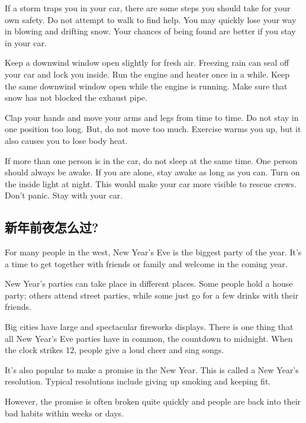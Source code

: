 If a storm traps you in your car, there are some steps
you should take for your own safety. Do not attempt to
walk to find help. You may quickly lose your way in blowing
and drifting snow. Your chances of being found are
better if you stay in your car.

Keep a downwind window open slightly for fresh air. Freezing
rain can seal off your car and lock you inside. Run the
engine and heater once in a while. Keep the same downwind
window open while the engine is running. Make sure
that snow has not blocked the exhaust pipe.

Clap your hands and move your arms and legs from time
to time. Do not stay in one position too long. But, do not
move too much. Exercise warms you up, but it also
causes you to lose body heat.

If more than one person is in the car, do not sleep at the
same time. One person should always be awake. If you
are alone, stay awake as long as you can. Turn on the inside
light at night. This would make your car more visible
to rescue crews. Don't panic. Stay with your car.
\subsection{新年前夜怎么过?}
\begin{margintable}\vspace{-2cm}\footnotesize
\end{margintable}
For many people in the west, New Year's Eve is the biggest
party of the year. It's a time to get together with friends or
family and welcome in the coming year.

New Year's parties can take place in different places.
Some people hold a house party; others attend street parties,
while some just go for a few drinks with their friends.

Big cities have large and spectacular fireworks displays.
There is one thing that all New Year's Eve parties have
in common, the countdown to midnight. When the clock
strikes 12, people give a loud cheer and sing songs.

It's also popular to make a promise in the New Year. This
is called a New Year's resolution. Typical resolutions
include giving up smoking and keeping fit.

However, the promise is often broken quite quickly and
people are back into their bad habits within weeks or days.

